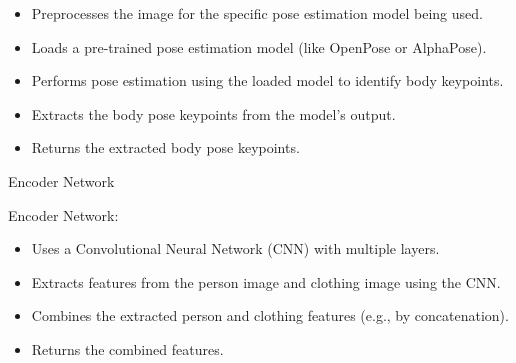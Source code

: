 \begin{itemize}
    \item Preprocesses the image for the specific pose estimation model being used.
    \item Loads a pre-trained pose estimation model (like OpenPose or AlphaPose).
    \item Performs pose estimation using the loaded model to identify body keypoints.
    \item Extracts the body pose keypoints from the model's output.
    \item Returns the extracted body pose keypoints.
\end{itemize}
\BlankLine
\begin{algorithm}[H]
  \SetAlgoLined


  \caption{Encoder Network}
  \label{alg:encoder}
  \BlankLine

\end{algorithm}
\BlankLine
Encoder Network:
\BlankLine
\begin{itemize}
    \item Uses a Convolutional Neural Network (CNN) with multiple layers.
    \item Extracts features from the person image and clothing image using the CNN.
    \item Combines the extracted person and clothing features (e.g., by concatenation).
    \item Returns the combined features.
\end{itemize}
\BlankLine

